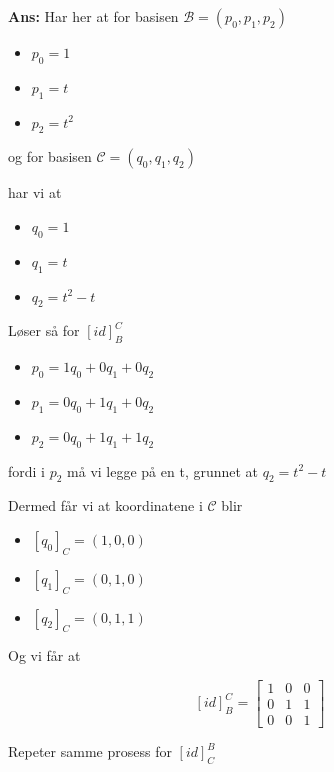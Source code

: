 \documentclass[11pt]{article}
\newenvironment{solbox}
  {\begin{mdframed}[linewidth=1pt,linecolor=black,roundcorner=5pt]
   \noindent\textbf{Ans: }\enspace}
  {\end{mdframed}}
\begin{document}
\begin{solbox}
  Har her at for basisen $ \mathcal{ B }  = \left( p_0,p_1,p_2 \right)  $ 

  \begin{itemize}
    \item $ p_0=1 $
    \item $ p_1=t $
    \item $ p_2=t^2 $   
  \end{itemize}

  og for basisen $ \mathcal{ C } = \left( q_0,q_1,q_2 \right)  $ 

  har vi at 

  \begin{itemize}
    \item $ q_0=1 $
    \item $ q_1=t $
    \item $ q_2=t^2-t $   
  \end{itemize}

  Løser så for $ \left[ id \right] _B^C $ 

 \begin{itemize}
    \item $ p_0=1q_0+0q_1+0q_2 $
    \item $ p_1=0q_0+1q_1+0q_2 $
    \item $ p_2=0q_0+1q_1+1q_2 $   
  \end{itemize}

  fordi i $ p_2 $ må vi legge på en t, grunnet at $ q_2=t^2-t $ 

  Dermed får vi at koordinatene i $ \mathcal{ C }$ blir
  
  \begin{itemize}
    \item $ \left[ q_0 \right]_C= \left( 1,0,0 \right)   $ 
    \item $ \left[ q_1 \right] _C = \left( 0,1,0 \right)  $ 
    \item $ \left[ q_2 \right] _C= \left( 0,1,1 \right)  $ 
  \end{itemize}

  Og vi får at 

  \[
      \left[ id \right] _B^C = \begin{bmatrix}
        1&0&0\\
        0&1&1\\
        0&0&1
      \end{bmatrix}
  \]

  Repeter samme prosess for $ \left[ id \right] _C^B $
  

\end{solbox}
\end{document}
